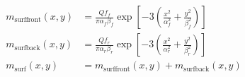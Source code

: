 \begin{align}
m_{\mathrm{surffront}}(x,y)
&=
\frac{Q f_f}{\pi \alpha_f \beta_f}
\exp\left[
-3\left(
\frac{x^2}{\alpha_f^2}
+
\frac{y^2}{\beta_f^2}
\right)
\right]
\tag{4}
\\
m_{\mathrm{surfback}}(x,y)
&=
\frac{Q f_r}{\pi \alpha_r \beta_r}
\exp\left[
-3\left(
\frac{x^2}{\alpha_r^2}
+
\frac{y^2}{\beta_r^2}
\right)
\right]
\tag{5}
\\
m_{\mathrm{surf}}(x,y)
&=
m_{\mathrm{surffront}}(x,y)
+
m_{\mathrm{surfback}}(x,y)
\tag{6}
\end{align}


